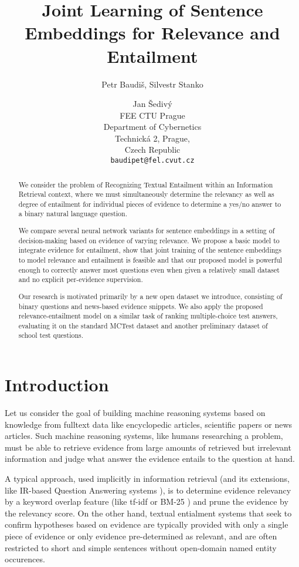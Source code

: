 \documentclass[11pt]{article}
\title{Joint Learning of Sentence Embeddings for Relevance and Entailment}
\author{Petr Baudi\v{s},
	Silvestr Stanko \and
	Jan \v{S}ediv\'{y} \\
	FEE CTU Prague\\
	Department of Cybernetics\\
	Technick\'{a} 2, Prague,\\Czech Republic\\
	{\tt baudipet@fel.cvut.cz}}
\date{}
\begin{document}
\maketitle

\begin{abstract}
	We consider the problem of Recognizing Textual Entailment
	within an Information Retrieval context, where we must simultaneously
	determine the relevancy as well as degree of entailment for individual
	pieces of evidence to determine a yes/no answer to a binary
	natural language question.

	We compare several neural network variants for sentence embeddings
	in a setting of decision-making based on evidence of varying relevance.
	We propose a basic model to integrate evidence for entailment,
	show that joint training of the sentence embeddings to model
	relevance and entailment is feasible and that our proposed model
	is powerful enough to correctly answer most questions even when
	given a relatively small dataset and no explicit per-evidence supervision.

	Our research is motivated primarily by a new open dataset we introduce,
	consisting of binary questions and news-based evidence snippets.
	We also apply the proposed relevance-entailment model on a similar task
	of ranking multiple-choice test answers, evaluating it on the standard
	MCTest dataset and another preliminary dataset of school test questions.
\end{abstract}

\section{Introduction}

Let us consider the goal of building machine reasoning systems based
on knowledge from fulltext data like encyclopedic articles, scientific
papers or news articles.
Such machine reasoning systems, like humans researching a problem,
must be able to retrieve evidence from large amounts of retrieved
but irrelevant information and judge what answer the evidence entails
to the question at hand.

A typical approach, used implicitly in information retrieval
(and its extensions, like IR-based Question Answering systems \cite{YodaQAPoster2015}),
is to determine evidence relevancy by a keyword overlap feature (like tf-idf or BM-25 \cite{BM25})
and prune the evidence by the relevancy score.
On the other hand, textual entialment systems that seek to confirm hypotheses
based on evidence \cite{RTE1} \cite{SICK2014} \cite{SNLI}
are typically provided with only a single piece of evidence
or only evidence pre-determined as relevant, and are often restricted
to short and simple sentences without open-domain named entity occurences.
\end{document}
